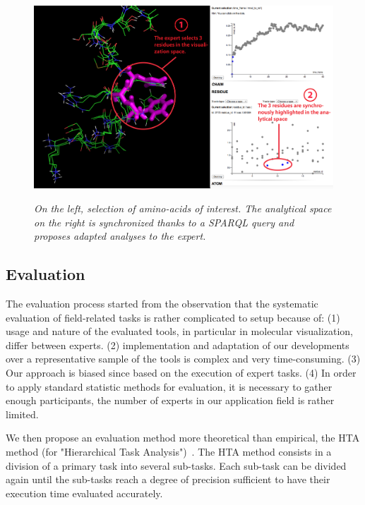 \documentclass{vgtc}                          %
\begin{document}
\begin{figure}[!htb]
  \centering
  {\includegraphics[width=\linewidth,frame]{./figures/scenario_step_2_cropped}}
    \caption[]{{\it On the left, selection of amino-acids of interest. The analytical space on the right is synchronized thanks to a SPARQL query and proposes adapted analyses to the expert.}}
  \label{Fig:2nd_step}
\end{figure}

\subsection{Evaluation}

The evaluation process started from the observation that the systematic evaluation of field-related tasks is rather complicated to setup because of: (1) usage and nature of the evaluated tools, in particular in molecular visualization, differ between experts. (2) implementation and adaptation of our developments over a representative sample of the tools is complex and very time-consuming. (3) Our approach is biased since based on the execution of expert tasks. (4) In order to apply standard statistic methods for evaluation, it is necessary to gather enough participants, the number of experts in our application field is rather limited.

We then propose an evaluation method more theoretical than empirical, the HTA method (for "Hierarchical Task Analysis")~\cite{annett2003hierarchical}. The HTA method consists in a division of a primary task into several sub-tasks. Each sub-task can be divided again until the sub-tasks reach a degree of precision sufficient to have their execution time evaluated accurately.
\end{document}
